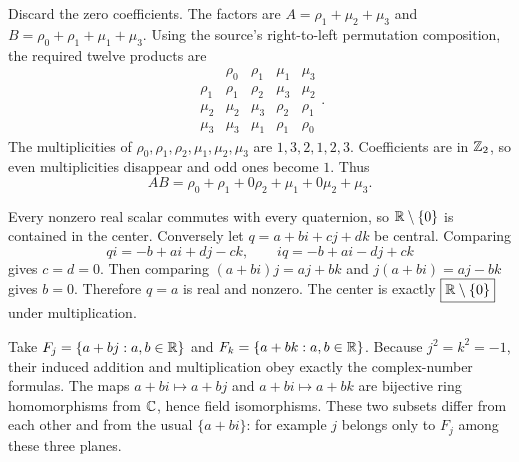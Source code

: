 Discard the zero coefficients. The factors are $A=\rho_1+\mu_2+\mu_3$ and $B=\rho_0+\rho_1+\mu_1+\mu_3$. Using the source's right-to-left permutation composition, the required twelve products are
\[
\begin{array}{c|cccc}&\rho_0&\rho_1&\mu_1&\mu_3\\\hline
\rho_1&\rho_1&\rho_2&\mu_3&\mu_2\\
\mu_2&\mu_2&\mu_3&\rho_2&\rho_1\\
\mu_3&\mu_3&\mu_1&\rho_1&\rho_0
\end{array}.
\]
The multiplicities of $\rho_0,\rho_1,\rho_2,\mu_1,\mu_2,\mu_3$ are $1,3,2,1,2,3$. Coefficients are in $\mathbb{Z}_2$, so even multiplicities disappear and odd ones become $1$. Thus
\[\boxed{AB=\rho_0+\rho_1+0\rho_2+\mu_1+0\mu_2+\mu_3}.
\]

Every nonzero real scalar commutes with every quaternion, so $\mathbb{R}\setminus\{0\}$ is contained in the center. Conversely let $q=a+bi+cj+dk$ be central. Comparing
\[qi=-b+ai+dj-ck,\qquad iq=-b+ai-dj+ck
\]
gives $c=d=0$. Then comparing $(a+bi)j=aj+bk$ and $j(a+bi)=aj-bk$ gives $b=0$. Therefore $q=a$ is real and nonzero. The center is exactly $\boxed{\mathbb{R}\setminus\{0\}}$ under multiplication.

Take $F_j=\{a+bj:a,b\in\mathbb{R}\}$ and $F_k=\{a+bk:a,b\in\mathbb{R}\}$. Because $j^2=k^2=-1$, their induced addition and multiplication obey exactly the complex-number formulas. The maps $a+bi\mapsto a+bj$ and $a+bi\mapsto a+bk$ are bijective ring homomorphisms from $\mathbb{C}$, hence field isomorphisms. These two subsets differ from each other and from the usual $\{a+bi\}$: for example $j$ belongs only to $F_j$ among these three planes.

